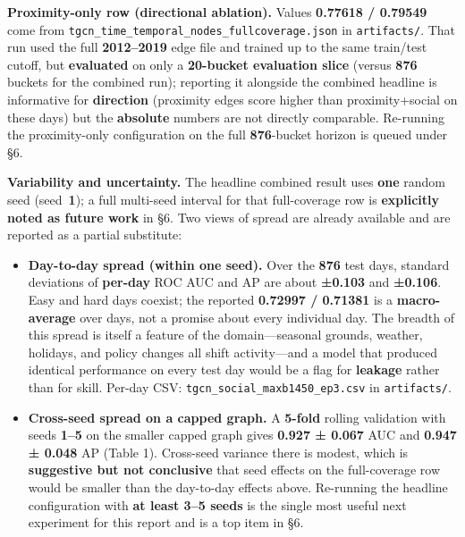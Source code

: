 \documentclass[
]{article}
\providecommand{\tightlist}{%
  \setlength{\itemsep}{0pt}\setlength{\parskip}{0pt}}
\begin{document}
\textbf{Proximity-only row (directional ablation).} Values
\textbf{0.77618 / 0.79549} come from
\texttt{tgcn\_time\_temporal\_nodes\_fullcoverage.json} in
\texttt{artifacts/}. That run used the full \textbf{2012--2019} edge
file and trained up to the same train/test cutoff, but
\textbf{evaluated} on only a \textbf{20-bucket evaluation slice} (versus
\textbf{876} buckets for the combined run); reporting it alongside the
combined headline is informative for \textbf{direction} (proximity edges
score higher than proximity+social on these days) but the
\textbf{absolute} numbers are not directly comparable. Re-running the
proximity-only configuration on the full \textbf{876}-bucket horizon is
queued under §6.

\textbf{Variability and uncertainty.} The headline combined result uses
\textbf{one} random seed (seed~\textbf{1}); a full multi-seed interval
for that full-coverage row is \textbf{explicitly noted as future work}
in §6. Two views of spread are already available and are reported as a
partial substitute:

\begin{itemize}
\tightlist
\item
  \textbf{Day-to-day spread (within one seed).} Over the \textbf{876}
  test days, standard deviations of \textbf{per-day} ROC AUC and AP are
  about \textbf{±0.103} and \textbf{±0.106}. Easy and hard days coexist;
  the reported \textbf{0.72997 / 0.71381} is a \textbf{macro-average}
  over days, not a promise about every individual day. The breadth of
  this spread is itself a feature of the domain---seasonal grounds,
  weather, holidays, and policy changes all shift activity---and a model
  that produced identical performance on every test day would be a flag
  for \textbf{leakage} rather than for skill. Per-day CSV:
  \texttt{tgcn\_social\_maxb1450\_ep3.csv} in \texttt{artifacts/}.
\item
  \textbf{Cross-seed spread on a capped graph.} A \textbf{5-fold}
  rolling validation with seeds \textbf{1--5} on the smaller capped
  graph gives \textbf{0.927 ± 0.067} AUC and \textbf{0.947 ± 0.048} AP
  (Table 1). Cross-seed variance there is modest, which is
  \textbf{suggestive but not conclusive} that seed effects on the
  full-coverage row would be smaller than the day-to-day effects above.
  Re-running the headline configuration with \textbf{at least 3--5
  seeds} is the single most useful next experiment for this report and
  is a top item in §6.
\end{itemize}
\end{document}
